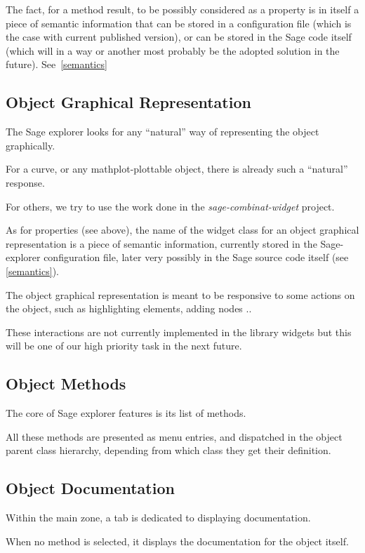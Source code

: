 \documentclass{deliverablereport}
\begin{document}
The fact, for a method result, to be possibly considered as a property
is in itself a piece of semantic information that can be stored in a
configuration file (which is the case with current published version),
or can be stored in the Sage code itself (which will in a way or
another most probably be the adopted solution in the future). See~\ref{semantics}

\subsection{Object Graphical Representation}
\label{representation}

The Sage explorer looks for any ``natural'' way of representing the
object graphically.

For a curve, or any mathplot-plottable object, there is already such a
``natural'' response.

For others, we try to use the work done in the
\emph{sage-combinat-widget} project.

As for properties (see above), the name of the widget class for an
object graphical representation is a piece of semantic information,
currently stored in the Sage-explorer configuration file, later very
possibly in the Sage source code itself (see \ref{semantics}).

The object graphical representation is meant to be responsive to some
actions on the object, such as highlighting elements, adding nodes ..

These interactions are not currently implemented in the library widgets but
this will be one of our high priority task in the next future.

\subsection{Object Methods}

The core of Sage explorer features is its list of methods.

All these methods are presented as menu entries, and dispatched in the
object parent class hierarchy, depending from
which class they get their definition.

\subsection{Object Documentation}

Within the main zone, a tab is dedicated to displaying documentation.

When no method is selected, it displays the documentation for the object itself.
\end{document}
